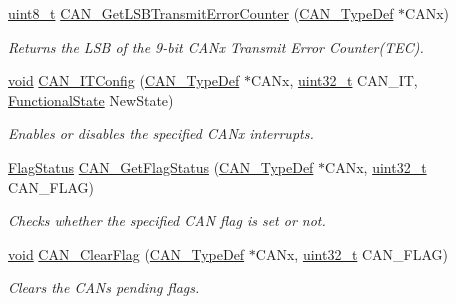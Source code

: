 \begin{DoxyCompactItemize}
\hyperlink{_p_e___types_8h_aba7bc1797add20fe3efdf37ced1182c5}{uint8\+\_\+t} \hyperlink{group___c_a_n___exported___functions_ga85ee0c35bf7ca15d4e4c862eef534843}{C\+A\+N\+\_\+\+Get\+L\+S\+B\+Transmit\+Error\+Counter} (\hyperlink{struct_c_a_n___type_def}{C\+A\+N\+\_\+\+Type\+Def} $\ast$C\+A\+Nx)
\begin{DoxyCompactList}\small\item\em Returns the L\+SB of the 9-\/bit C\+A\+Nx Transmit Error Counter(\+T\+E\+C). \end{DoxyCompactList}\item 
\hyperlink{usb__devapi_8h_afabf60e7f57651d6d595a02c75f07cd0}{void} \hyperlink{group___c_a_n___exported___functions_gad1a8b2499a780b5bfa4accb3597b02f4}{C\+A\+N\+\_\+\+I\+T\+Config} (\hyperlink{struct_c_a_n___type_def}{C\+A\+N\+\_\+\+Type\+Def} $\ast$C\+A\+Nx, \hyperlink{_p_e___types_8h_a33594304e786b158f3fb30289278f5af}{uint32\+\_\+t} C\+A\+N\+\_\+\+IT, \hyperlink{agilefox_2library_2inc_2stm32f10x__type_8h_ac9a7e9a35d2513ec15c3b537aaa4fba1}{Functional\+State} New\+State)
\begin{DoxyCompactList}\small\item\em Enables or disables the specified C\+A\+Nx interrupts. \end{DoxyCompactList}\item 
\hyperlink{agilefox_2library_2inc_2stm32f10x__type_8h_a89136caac2e14c55151f527ac02daaff}{Flag\+Status} \hyperlink{group___c_a_n___exported___functions_ga2faad96caf823ef463cc5b5b25c480bb}{C\+A\+N\+\_\+\+Get\+Flag\+Status} (\hyperlink{struct_c_a_n___type_def}{C\+A\+N\+\_\+\+Type\+Def} $\ast$C\+A\+Nx, \hyperlink{_p_e___types_8h_a33594304e786b158f3fb30289278f5af}{uint32\+\_\+t} C\+A\+N\+\_\+\+F\+L\+AG)
\begin{DoxyCompactList}\small\item\em Checks whether the specified C\+AN flag is set or not. \end{DoxyCompactList}\item 
\hyperlink{usb__devapi_8h_afabf60e7f57651d6d595a02c75f07cd0}{void} \hyperlink{group___c_a_n___exported___functions_ga2c01646d5d3a2d7045e8dd71f58f8742}{C\+A\+N\+\_\+\+Clear\+Flag} (\hyperlink{struct_c_a_n___type_def}{C\+A\+N\+\_\+\+Type\+Def} $\ast$C\+A\+Nx, \hyperlink{_p_e___types_8h_a33594304e786b158f3fb30289278f5af}{uint32\+\_\+t} C\+A\+N\+\_\+\+F\+L\+AG)
\begin{DoxyCompactList}\small\item\em Clears the C\+AN\textquotesingle{}s pending flags. \end{DoxyCompactList}\item 

\end{DoxyCompactItemize}
